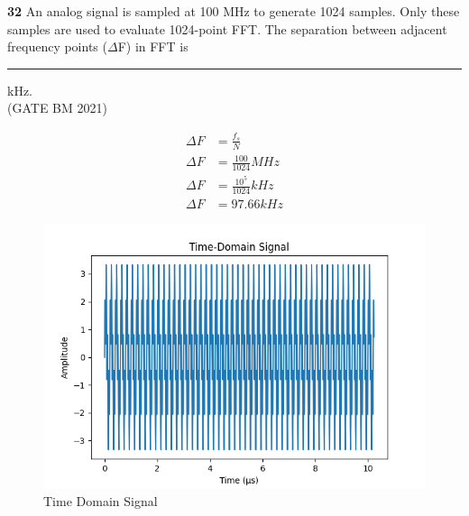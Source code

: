 \documentclass[journal,12pt,twocolumn]{IEEEtran}
\begin{document}


\vspace{3cm}

\title{}
\author{EE23BTECH11047 - Deepakreddy P
}
\maketitle
\newpage
\bigskip

\noindent \textbf{32} \quad An analog signal is sampled at 100 MHz to generate 1024 samples. Only
these samples are used to evaluate 1024-point FFT. The separation between
adjacent frequency points ($\Delta$F) in FFT is \rule{1cm}{0.5mm} kHz.\\
\hfill (GATE BM 2021)\\
\solution
\fi

\begin{center}
    \begin{table}[ht]
        
    \end{table}
\end{center}

\begin{align}
    \Delta F &= \frac{f_s}{N}\\
    \Delta F &= \frac{100}{1024} MHz\\
    \Delta F &= \frac{10^5}{1024} kHz\\
    \Delta F &= 97.66kHz
\end{align}


\begin{figure}[ht]
   \centering
   \includegraphics[width=1.1\columnwidth]{2021/BM/32/figs/fig1.png}
   \caption{Time Domain Signal}
\end{figure}
\end{document}
